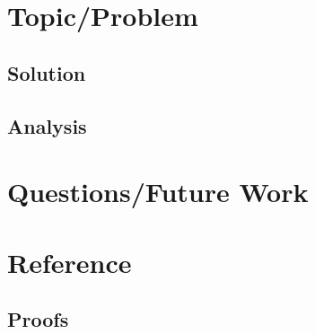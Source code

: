 \documentclass[11pt,a4paper,BCOR12mm, headexclude, footexclude, twoside, openright]{scrartcl}
\begin{document}




\section{Topic/Problem}





\subsection{Solution}




\subsection{Analysis}



\section{Questions/Future Work}



\appendix
\section{Reference}

\subsection{Proofs}
%

\end{document}
